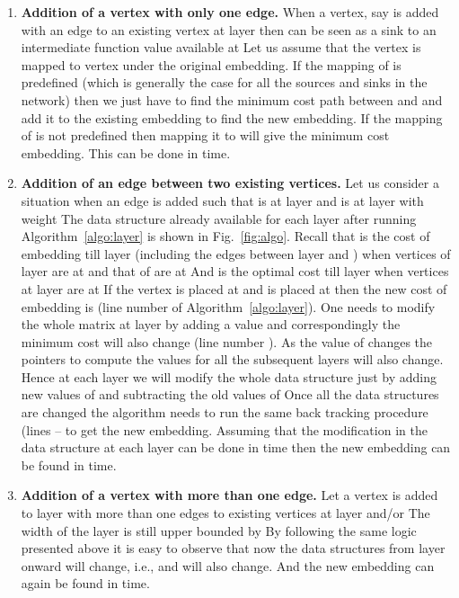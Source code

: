 \documentclass[journal]{IEEEtran}
\begin{document}
\begin{enumerate}
\item \textbf{Addition of a vertex with only one edge.} When a vertex,
  say  is added with an edge  to an existing vertex  at
  layer  then  can be seen as a sink to an intermediate
  function value available at  Let us assume that the vertex 
  is mapped to vertex  under the original
  embedding. If the mapping  of  is predefined
  (which is generally the case for all the sources and sinks in the
  network) then we just have to find the minimum cost path between
   and  and add it to the existing embedding to find the new
  embedding. If the mapping of  is not predefined then mapping it
  to  will give the minimum cost embedding. This can be done in
   time.

\item \textbf{Addition of an edge between two existing vertices.} Let
  us consider a situation when an edge  is added such that  is
  at layer  and  is at layer  with weight 
  The data structure already available for each layer  after
  running Algorithm~\ref{algo:layer} is shown in
  Fig.~\ref{fig:algo}. Recall that  is the cost of
  embedding till layer  (including the edges between layer  and
  ) when vertices of layer  are at  and that of 
  are at  And  is the optimal cost till layer  when
  vertices at layer  are at  If the vertex  is placed
  at  and  is placed at  then the new
  cost of embedding is  (line number  of
  Algorithm~\ref{algo:layer}). One needs to modify the whole 
  matrix at layer  by adding a value and correspondingly the
  minimum cost  will also change (line number ). As
  the value of  changes the pointers to compute  the
  values for all the subsequent layers will also change. Hence at each
  layer  we will modify the whole data structure just by adding new
  values of  and subtracting the old values of 
  Once all the data structures are changed the algorithm needs to run
  the same back tracking procedure (lines -- to get the new
  embedding. Assuming that the modification in the data structure at
  each layer can be done in  time then the new embedding can be
  found in  time.

\item \textbf{Addition of a vertex with more than one edge.} Let a
  vertex  is added to layer  with more than one edges to
  existing vertices at layer  and/or  The width of the
  layer  is still upper bounded by  By following the same logic
  presented above it is easy to observe that now the data structures
  from layer  onward will change, i.e.,  and
   will also change. And the new embedding can again be
  found in  time.
\end{enumerate}
\end{document}
